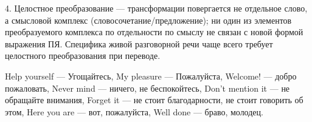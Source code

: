 4. Целостное преобразование --- трансформации повергается не отдельное слово, а смысловой комплекс (словосочетание/предложение); ни один из элементов преобразуемого комплекса по отдельности по смыслу не связан с новой формой выражения ПЯ. Специфика живой разговорной речи чаще всего требует целостного преобразования при переводе.

Help yourself --- Угощайтесь, My pleasure --- Пожалуйста, Welcome! --- добро пожаловать, Never mind --- ничего, не беспокойтесь, Don’t mention it --- не обращайте внимания, Forget it --- не стоит благодарности, не стоит говорить об этом, Here you are --- вот, пожалуйста, Well done --- браво, молодец.